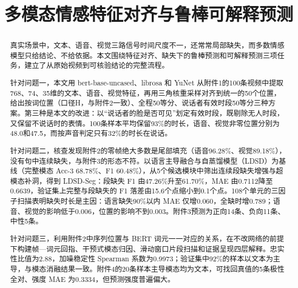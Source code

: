 \documentclass[bwprint]{gmcmthesis}
\title{多模态情感特征对齐与鲁棒可解释预测}
\newcommand\secdot{.}
\newcommand\tocsecdot{.}
\begin{document}
\maketitle

\begin{abstract}
真实场景中，文本、语音、视觉三路信号时间尺度不一，还常常局部缺失，而多数情感模型只给结论、不给依据。本文围绕特征对齐、缺失下的鲁棒预测和可解释预测三项任务，建立了从原始视频到可核验结论的完整流程。

针对问题一，本文用 bert-base-uncased、librosa 和 YuNet 从附件1的100条视频中提取768、74、35维的文本、语音、视觉特征，再用三角核重采样对齐到统一的50个位置，给出按词位置（口径H，与附件2一致）、全程50等分、说话者有效时段50等分三种方案。第三种是本文的改进：以“说话者的脸是否可见”划定有效时段，既剔除无人时段，又保留不说话时的表情。100条样本平均保留93\%的时长，语音、视觉非零位置分别为48.0和47.5，而按声音判定只有32\%的时长在说话。

针对问题二，核查发现附件2的零帧绝大多数是尾部填充（语音96.28\%、视觉89.18\%），没有句中连续缺失，与附件3的形态不符。以语言主导融合与自蒸馏模型（LDSD）为基线（完整模态 Acc-3 68.78\%、F1 60.48\%），从5个候选模块中筛出连续段缺失增强与超模态补洞，得到 LDSD-Seg：段缺失 F1 由47.26\%升至61.70\%，MAE 由0.7112降至0.6639，验证集上完整与段缺失的 F1 落差由15.6个点缩小到0.1个点。108个单元的三因子扫描表明缺失时长是主因：语言缺失90\%以内 MAE 仅增0.060，全缺时增0.789；语音、视觉的影响低于0.006，位置的影响不到0.003。附件3预测为正向14条、负向11条、中性5条。

针对问题三，利用附件2中序列位置与 BERT 词元一一对应的关系，在不改网络的前提下构建帧—词元回指、干预式模态归因、滑动窗口片段扫描和证据呈现四层解释。忠实性比值为2.88，加噪稳定性 Spearman 系数为0.9973；验证集中92\%的样本以文本为主导，与模态消融结果一致。附件4的20条样本主导模态均为文本，可找回真值的5条极性全对、强度 MAE 为0.3334，但预测强度普遍偏大。

\end{abstract}

\pagestyle{plain}
\tableofcontents
\newpage












\newpage
\appendix
\makeatletter
\renewcommand\secdot{}
\renewcommand\thesubsection{\Alph{section}.\arabic{subsection}}
\makeatother
\addtocontents{toc}{\protect\renewcommand\protect\tocsecdot{}}

\end{document}
